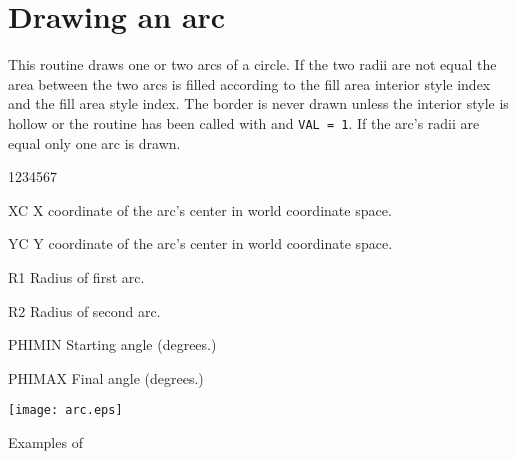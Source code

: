 \newpage

\section{Drawing an arc}
\Action
This routine draws one or two arcs of a circle. If the two radii are not equal the area
between the two arcs is filled according to the fill area interior style index
and the fill area style index. The border is never drawn unless the interior
style is hollow or the routine  has been called with  and
{\tt VAL = 1}. If the arc's radii are equal only one arc is drawn.
\Pdesc
\begin{DLtt}{1234567}
\item[XC]     X coordinate of the arc's center in world coordinate space.
\item[YC]     Y coordinate of the arc's center in world coordinate space.
\item[R1]     Radius of first arc.
\item[R2]     Radius of second arc.
\item[PHIMIN] Starting angle (degrees.)
\item[PHIMAX] Final angle (degrees.)
\end{DLtt}

\begin{Fighere}
\begin{center}\texttt{[image: arc.eps]}\end{center}
\caption{Examples of \protect{}}
\label{fig-FIGU005S}
\end{Fighere}
\newpage

